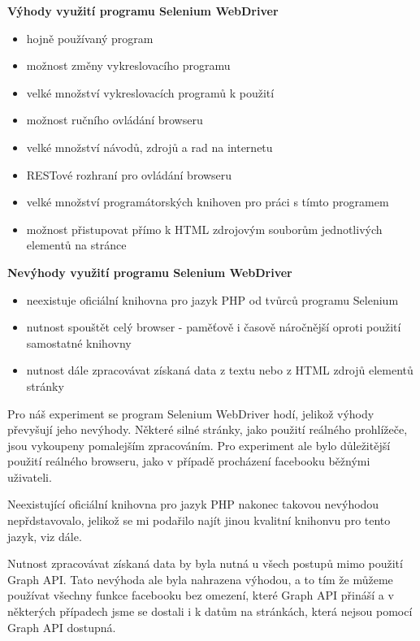 \documentclass[thesis=M,czech]{FITthesis}[2013/05/10]
\begin{document}
\textbf{Výhody využití programu Selenium WebDriver}

\begin{itemize}
  \item hojně používaný program
  \item možnost změny vykreslovacího programu
  \item velké množství vykreslovacích programů k použití
  \item možnost ručního ovládání browseru
  \item velké množství návodů, zdrojů a rad na internetu
  \item RESTové rozhraní pro ovládání browseru
  \item velké množství programátorských knihoven pro práci s tímto programem
  \item možnost přistupovat přímo k HTML zdrojovým souborům jednotlivých elementů na stránce
\end{itemize}

\textbf{Nevýhody využití programu Selenium WebDriver}

\begin{itemize}
  \item neexistuje oficiální knihovna pro jazyk PHP 
  od tvůrců programu Selenium
  \item nutnost spouštět celý browser - paměťově i časově náročnější
  oproti použití samostatné knihovny
  \item nutnost dále zpracovávat získaná data z textu nebo z HTML zdrojů elementů stránky
\end{itemize}

Pro náš experiment se program Selenium WebDriver hodí, jelikož výhody převyšují jeho nevýhody. Některé silné stránky, jako použití reálného prohlížeče, jsou vykoupeny pomalejším zpracováním. Pro experiment ale bylo důležitější použití reálného browseru, jako v případě procházení facebooku běžnými uživateli.

Neexistující oficiální knihovna pro jazyk PHP nakonec takovou nevýhodou nepřdstavovalo, jelikož se mi podařilo najít jinou kvalitní knihonvu pro tento jazyk, viz dále.

Nutnost zpracovávat získaná data by byla nutná u všech postupů mimo použití Graph API. Tato nevýhoda ale byla nahrazena výhodou, a to tím že můžeme používat všechny funkce facebooku bez omezení, které Graph API přináší a v některých případech jsme se dostali i k datům na stránkách, která nejsou pomocí Graph API dostupná.
\end{document}
